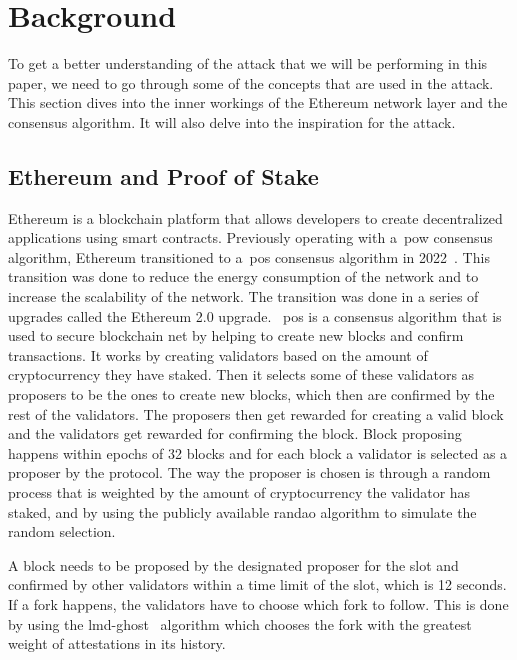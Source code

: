 
\section{Background}\label{sec:background}
To get a better understanding of the attack that we will be performing in this paper, we need to go through some of the concepts that are used in the attack.
This section dives into the inner workings of the Ethereum network layer and the consensus algorithm.
It will also delve into the inspiration for the attack.


\subsection{Ethereum and Proof of Stake}\label{subsec:ethereum-and-proof-of-stake}
Ethereum is a blockchain platform that allows developers to create decentralized applications using smart contracts.
Previously operating with a~\gls{pow} consensus algorithm, Ethereum transitioned to a~\gls{pos} consensus algorithm in 2022~\cite{EthereumProof-of-stakePoS}.
This transition was done to reduce the energy consumption of the network and to increase the scalability of the network.
The transition was done in a series of upgrades called the Ethereum 2.0 upgrade.
~\gls{pos} is a consensus algorithm that is used to secure blockchain net by helping to create new blocks and confirm transactions.
It works by creating validators based on the amount of cryptocurrency they have staked.
Then it selects some of these validators as proposers to be the ones to create new blocks, which then are confirmed by the rest of the validators.
The proposers then get rewarded for creating a valid block and the validators get rewarded for confirming the block.
Block proposing happens within epochs of 32 blocks and for each block a validator is selected as a proposer by the protocol.
The way the proposer is chosen is through a random process that is weighted by the amount of cryptocurrency the validator has staked, and by using the publicly available \gls{randao} algorithm to simulate the random selection.

A block needs to be proposed by the designated proposer for the slot and confirmed by other validators within a time limit of the slot, which is 12 seconds.
If a fork happens, the validators have to choose which fork to follow.
This is done by using the \gls{lmd-ghost}~\cite{EthereumProof-of-stakePoS} algorithm which chooses the fork with the greatest weight of attestations in its history.

